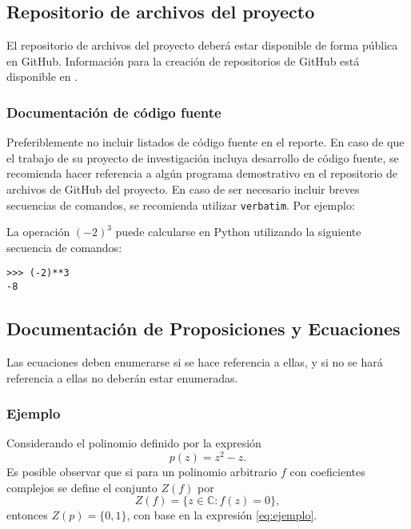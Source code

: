 \documentclass[peerreview]{IEEEtran}
\begin{document}
\subsection{Repositorio de archivos del proyecto}

El repositorio de archivos del proyecto deber\'a estar disponible de forma p\'ublica en GitHub. Informaci\'on para la creaci\'on de repositorios de GitHub est\'a disponible en \cite{GitHub-Docs}.

\subsubsection{Documentaci\'on de c\'odigo fuente}

Preferiblemente no incluir listados de c\'odigo fuente en el reporte. En caso de que el trabajo de su proyecto de investigaci\'on incluya desarrollo de c\'odigo fuente, se recomienda hacer referencia a alg\'un programa demostrativo en el repositorio de archivos de GitHub del proyecto. En caso de ser necesario incluir breves secuencias de comandos, se recomienda utilizar {\tt verbatim}. Por ejemplo:

La operaci\'on $(-2)^3$ puede calcularse en Python utilizando la siguiente secuencia de comandos:
\begin{verbatim}
>>> (-2)**3
-8
\end{verbatim}

\subsection{Documentaci\'on de Proposiciones y Ecuaciones}

Las ecuaciones deben enumerarse si se hace referencia a ellas, y si no se har\'a referencia a ellas no deber\'an estar enumeradas. 
\subsubsection*{Ejemplo} Considerando el polinomio definido por la expresi\'on
\begin{equation*}
p(z)=z^2-z.
\end{equation*}
Es posible observar que si para un polinomio arbitrario $f$ con coeficientes complejos se define el conjunto $Z(f)$ por
\begin{equation}
\label{eq:ejemplo}
Z(f)=\{z\in \mathbb{C}:f(z)=0\},
\end{equation}
entonces $Z(p)=\{0,1\}$, con base en la expresi\'on \eqref{eq:ejemplo}.
\end{document}
